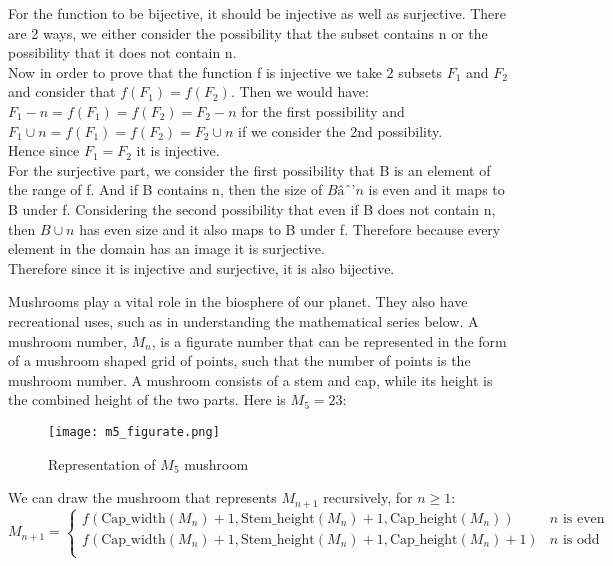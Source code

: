 \documentclass[addpoints]{exam}
\begin{document}
\begin{questions}
  \begin{solution}
    For the function to be bijective, it should be injective as well as surjective. There are 2 ways, we either consider the possibility that the subset contains n or the possibility that it does not contain n.\\
    Now in order to prove that the function f is injective we take 2 subsets $F_1$ and $F_2$ and consider that $f(F_1) = f(F_2)$. Then we would have:\\
   $ F_1 - {n} = f(F_1) = f(F_2) = F_2 - {n}$ for the first possibility and\\
    $F_1 \cup {n} = f(F_1) = f(F_2) = F_2 \cup {n}$ if we consider the 2nd possibility. \\
    Hence since $F_1 = F_2$ it is injective. \\
    For the surjective part,  we consider the first possibility that B is an element of the range of f. And if B contains n, then the size of $Bâˆ’{n}$ is even and it maps to B under f. Considering the second possibility that even if B does not contain n, then $B\cup{n}$ has even size and it also maps to B under f. Therefore because every element in the domain has an image it is surjective.\\
    Therefore since it is injective and surjective, it is also bijective.
  \end{solution}
  
\question Mushrooms play a vital role in the biosphere of our planet. They also have recreational uses, such as in understanding the mathematical series below. A mushroom number, $M_n$, is a figurate number that can be represented in the form of a mushroom shaped grid of points, such that the number of points is the mushroom number. A mushroom consists of a stem and cap, while its height is the combined height of the two parts. Here is $M_5=23$:

\begin{figure}[h]
  \centering
  \texttt{[image: m5\_figurate.png]}
  \caption{Representation of $M_5$ mushroom}
  \label{fig:mushroom_anatomy}
\end{figure}

We can draw the mushroom that represents $M_{n+1}$ recursively, for $n \geq 1$:
\[ 
    M_{n+1}=
    \begin{cases} 
      f(\textrm{Cap\_width}(M_n) + 1, \textrm{Stem\_height}(M_n) + 1, \textrm{Cap\_height}(M_n))  & n \textrm{ is even} \\
      f(\textrm{Cap\_width}(M_n) + 1, \textrm{Stem\_height}(M_n) + 1, \textrm{Cap\_height}(M_n)+1) & n \textrm{ is odd}  \\      
   \end{cases}
\]


\end{questions}
\end{document}
